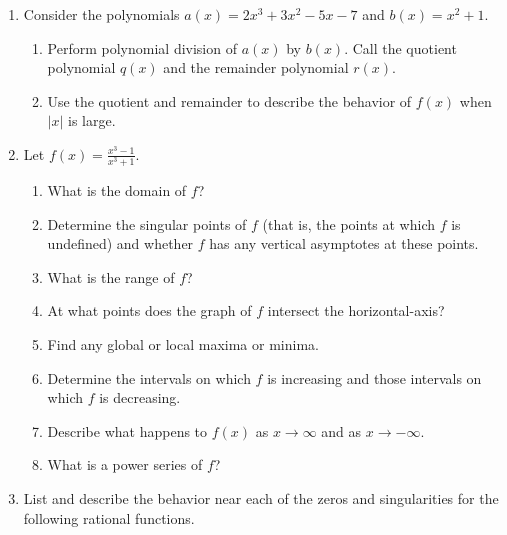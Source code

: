 \documentclass[
]{book}
\providecommand{\tightlist}{%
  \setlength{\itemsep}{0pt}\setlength{\parskip}{0pt}}
\theoremstyle{definition}
\theoremstyle{definition}
\theoremstyle{definition}
\theoremstyle{definition}
\theoremstyle{remark}
\begin{document}
\begin{enumerate}
\def\labelenumi{\arabic{enumi}.}
\item
  Consider the polynomials \(a(x)=2x^3+3x^2-5x-7\) and \(b(x)=x^2+1\).

  \begin{enumerate}
  \def\labelenumii{\alph{enumii}.}
  \tightlist
  \item
    Perform polynomial division of \(a(x)\) by \(b(x)\). Call the quotient polynomial \(q(x)\) and the remainder polynomial \(r(x)\).
  \item
    Use the quotient and remainder to describe the behavior of \(f(x)\) when \(|x|\) is large.
  \end{enumerate}
\item
  Let \(\displaystyle{f(x)=\frac{x^3-1}{x^3+1}}\).

  \begin{enumerate}
  \def\labelenumii{\alph{enumii}.}
  \tightlist
  \item
    What is the domain of \(f\)?
  \item
    Determine the singular points of \(f\) (that is, the points at which \(f\) is undefined) and whether \(f\) has any vertical asymptotes at these points.
  \item
    What is the range of \(f\)?
  \item
    At what points does the graph of \(f\) intersect the horizontal-axis?
  \item
    Find any global or local maxima or minima.
  \item
    Determine the intervals on which \(f\) is increasing and those intervals on which \(f\) is decreasing.
  \item
    Describe what happens to \(f(x)\) as \(x\rightarrow \infty\) and as \(x \rightarrow -\infty\).
  \item
    What is a power series of \(f\)?
  \end{enumerate}
\item
  List and describe the behavior near each of the zeros and singularities for the following rational functions.


\end{enumerate}
\end{document}
